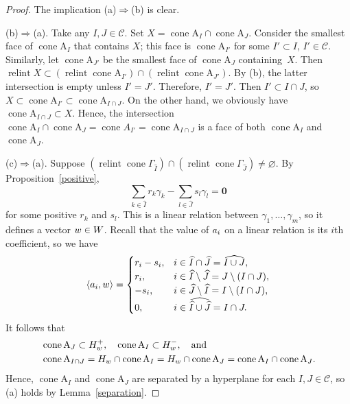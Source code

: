 \documentclass[a4paper]{amsart}
\theoremstyle{definition}
\theoremstyle{remark}
\numberwithin{equation}{section}
\newcommand{\mb}[1]{{\textbf {\textit#1}}}
\def\cone{\mathop{\mathrm{cone}}}
\def\relint{\mathop{\mathrm{relint}}}
\newcommand{\<}{\langle}
\renewcommand{\>}{\rangle}
\begin{document}
\begin{proof} The implication (a)$\Rightarrow$(b) is clear.

(b)$\Rightarrow$(a). Take any $I,J\in\mathcal C$. Set $X=\cone\mathrm A_I\cap
\cone\mathrm A_J$. Consider the smallest face of $\cone\mathrm A_I$ that contains $X$; this face is $\cone\mathrm A_{I'}$ for some $I'\subset I$, $I'\in\mathcal C$. Similarly, let $\cone\mathrm A_{J'}$ be the smallest face of $\cone\mathrm A_J$ containing~$X$. Then $\relint X\subset(\relint \cone\mathrm A_{I'})\cap(\relint \cone\mathrm A_{J'})$. By (b), the latter intersection is empty unless $I'=J'$. Therefore, $I'=J'$. Then $I'\subset I\cap J$, so $X\subset \cone\mathrm A_{I'}\subset\cone\mathrm A_{I\cap J}$. On the other hand, we obviously have $\cone\mathrm A_{I\cap J}\subset X$.  Hence, the intersection $\cone\mathrm A_I\cap\cone\mathrm A_J=\cone A_{I'}=\cone\mathrm A_{I\cap J}$ is a face of both $\cone\mathrm A_I$ and $\cone\mathrm A_J$.

(c)$\Rightarrow$(a).
Suppose $(\relint\cone\Gamma_{\widehat I})\cap(\relint\cone\Gamma_{\widehat J})\ne\varnothing$. By Proposition~\ref{positive},
\begin{equation}\label{intrel}
  \sum_{k\in\widehat I}r_k\gamma_k-\sum_{l\in\widehat J}s_l\gamma_l=\mathbf 0
\end{equation}
for some positive $r_k$ and $s_l$. This is a linear relation between $\gamma_1,\ldots,\gamma_m$, so it defines a vector $\mb w\in W$. %
Recall that the value of $\mb a_i$ on a linear relation is its $i$th coefficient, so we have 
\begin{equation}\label{wacases}
  \langle\mb a_i,\mb w\rangle=\begin{cases}
  r_i-s_i,& i\in\widehat I\cap\widehat J=\widehat{I\cup J},\\
  r_i,& i\in \widehat I\setminus\widehat J=J\setminus (I\cap J),   \\
  -s_i,& i\in \widehat J\setminus\widehat I=I\setminus (I\cap J), \\
  0,& i\in \widehat{\widehat I\cup\widehat J}=I\cap J.
  \end{cases}
\end{equation}
It follows that 
\begin{equation}\label{Hw}
\begin{aligned}
&\cone\mathrm A_J\subset H^+_{\mb w},\quad 
\cone\mathrm A_I\subset H^-_{\mb w},\quad\text{and}\\
&\cone\mathrm A_{I\cap J}=H_{\mb w}\cap \cone\mathrm A_I= H_{\mb w}\cap\cone\mathrm A_J=\cone\mathrm A_I\cap
  \cone\mathrm A_J.
\end{aligned}
\end{equation}
Hence, $\cone\mathrm A_I$ and $\cone\mathrm A_J$ are separated by a hyperplane for each $I,J\in\mathcal C$, so (a) holds by Lemma~\ref{separation}.


\end{proof}
\end{document}
